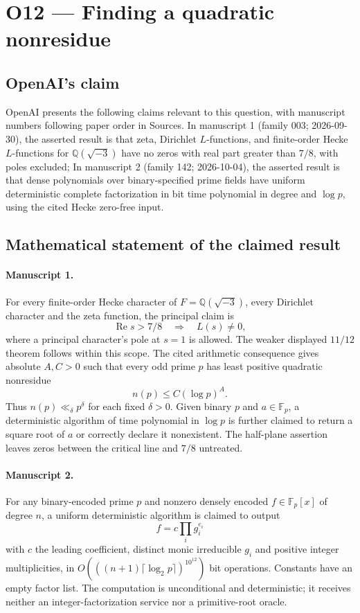 \documentclass[11pt]{article}
\begin{document}
\section*{O12 — Finding a quadratic nonresidue}

\subsection{OpenAI's claim}
OpenAI presents the following claims relevant to this question, with manuscript numbers following paper order in Sources. In manuscript 1 (family 003; 2026-09-30), the asserted result is that zeta, Dirichlet $L$-functions, and finite-order Hecke $L$-functions for $\mathbb Q(\sqrt{-3})$ have no zeros with real part greater than $7/8$, with poles excluded; In manuscript 2 (family 142; 2026-10-04), the asserted result is that dense polynomials over binary-specified prime fields have uniform deterministic complete factorization in bit time polynomial in degree and $\log p$, using the cited Hecke zero-free input.

\subsection{Mathematical statement of the claimed result}
\paragraph{Manuscript 1.}
For every finite-order Hecke character of $F=\mathbb Q(\sqrt{-3})$, every Dirichlet character and the zeta function, the principal claim is
\[
 \operatorname{Re}s>7/8\quad\Longrightarrow\quad L(s)\ne0,
\]
where a principal character's pole at $s=1$ is allowed. The weaker displayed $11/12$ theorem follows within this scope. The cited arithmetic consequence gives absolute $A,C>0$ such that every odd prime $p$ has least positive quadratic nonresidue
\[
 n(p)\le C(\log p)^A.
\]
Thus $n(p)\ll_{\delta} p^{\delta}$ for each fixed $\delta>0$. Given binary $p$ and $a\in\mathbb F_p$, a deterministic algorithm of time polynomial in $\log p$ is further claimed to return a square root of $a$ or correctly declare it nonexistent. The half-plane assertion leaves zeros between the critical line and $7/8$ untreated.

\paragraph{Manuscript 2.}
For any binary-encoded prime $p$ and nonzero densely encoded $f\in\mathbb F_p[x]$ of degree $n$, a uniform deterministic algorithm is claimed to output
\[
 f=c\prod_i g_i^{e_i}
\]
with $c$ the leading coefficient, distinct monic irreducible $g_i$ and positive integer multiplicities, in $O(((n+1)\lceil\log_2p\rceil)^{10^{12}})$ bit operations. Constants have an empty factor list. The computation is unconditional and deterministic; it receives neither an integer-factorization service nor a primitive-root oracle.
\end{document}
